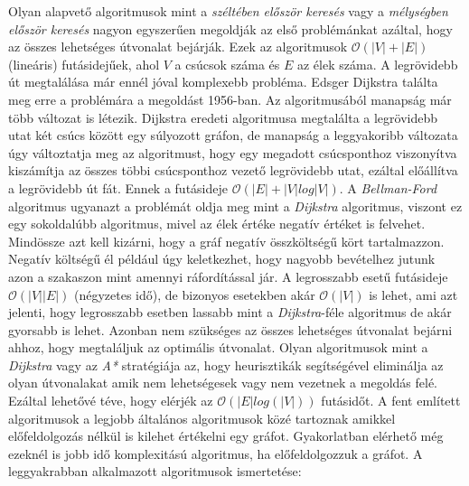 \noindent Olyan alapvető algoritmusok mint a \textit{széltében először keresés} vagy a \textit{mélységben először keresés} nagyon egyszerűen megoldják az első problémánkat azáltal, hogy az összes lehetséges útvonalat bejárják. Ezek az algoritmusok $\mathcal{O}(|V| + |E|)$ (lineáris) futásidejűek, ahol $V$ a csúcsok száma és $E$ az élek száma.
\newline
\newline A legrövidebb út megtalálása már ennél jóval komplexebb probléma. 
\newline
\newline Edsger Dijkstra találta meg erre a problémára a megoldást 1956-ban. Az algoritmusából manapság már több változat is létezik. Dijkstra eredeti algoritmusa megtalálta a legrövidebb utat két csúcs között egy súlyozott gráfon, de manapság a leggyakoribb változata úgy változtatja meg az algoritmust, hogy egy megadott csúcsponthoz viszonyítva kiszámítja az összes többi csúcsponthoz vezető legrövidebb utat, ezáltal előállítva a legrövidebb út fát. Ennek a futásideje $\mathcal{O}(|E| + |V| log|V|)$. 
\newline
\newline A \textit{Bellman-Ford} algoritmus ugyanazt a problémát oldja meg mint a \textit{Dijkstra} algoritmus, viszont ez egy sokoldalúbb algoritmus, mivel az élek értéke negatív értéket is felvehet. Mindössze azt kell kizárni, hogy a gráf negatív összköltségű kört tartalmazzon. Negatív költségű él például úgy keletkezhet, hogy nagyobb bevételhez jutunk azon a szakaszon mint amennyi ráfordítással jár. A legrosszabb esetű futásideje $\mathcal{O}(|V||E|)$ (négyzetes idő), de bizonyos esetekben akár $\mathcal{O}(|V|)$ is lehet, ami azt jelenti, hogy legrosszabb esetben lassabb mint a \textit{Dijkstra}-féle algoritmus de akár gyorsabb is lehet. 
\newline
\newline Azonban nem szükséges az összes lehetséges útvonalat bejárni ahhoz, hogy megtaláljuk az optimális útvonalat. Olyan algoritmusok mint a \textit{Dijkstra} vagy az \textit{A*} stratégiája az, hogy heurisztikák segítségével eliminálja az olyan útvonalakat amik nem lehetségesek vagy nem vezetnek a megoldás felé. Ezáltal lehetővé téve, hogy elérjék az $\mathcal{O}(|E| log(|V|))$ futásidőt. 
\newline
\newline A fent említett algoritmusok a legjobb általános algoritmusok közé tartoznak amikkel előfeldolgozás nélkül is kilehet értékelni egy gráfot. Gyakorlatban elérhető még ezeknél is jobb idő komplexitású algoritmus, ha előfeldolgozzuk a gráfot.
\newline
\newline A leggyakrabban alkalmazott algoritmusok ismertetése:

